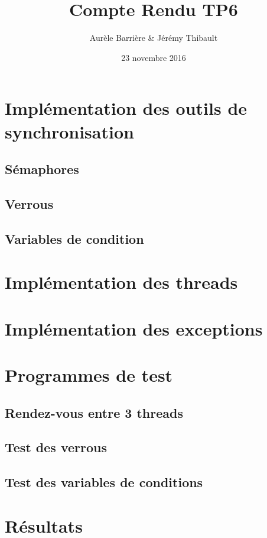 \documentclass{article}
\title{Compte Rendu TP6}
\author{Aurèle Barrière \& Jérémy Thibault}
\date{23 novembre 2016}
\begin{document}
\maketitle

\section{Implémentation des outils de synchronisation}
\subsection{Sémaphores}
\subsection{Verrous}
\subsection{Variables de condition}

\section{Implémentation des threads}

\section{Implémentation des exceptions}

\section{Programmes de test}
\subsection{Rendez-vous entre 3 threads}
\subsection{Test des verrous}
\subsection{Test des variables de conditions}

\section{Résultats}
\end{document}
